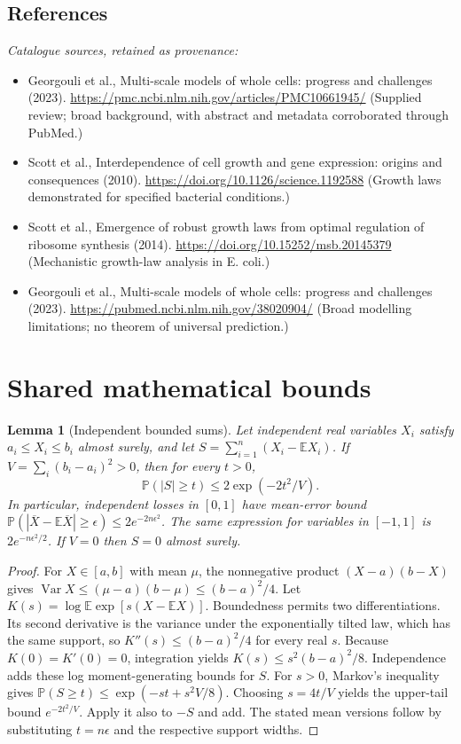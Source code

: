 \documentclass[11pt]{article}
\newcommand{\E}{\mathbb E}
\newcommand{\Prob}{\mathbb P}
\DeclareMathOperator{\Var}{Var}
\providecommand{\E}{\mathbb E}
\providecommand{\Prob}{\mathbb P}
\providecommand{\Var}{\operatorname{Var}}
\newtheorem{sharedlemma}{Lemma}[section]
\begin{document}
\subsection{References}
\noindent\emph{Catalogue sources, retained as provenance:}
\begin{itemize}
\item Georgouli et al., Multi-scale models of whole cells: progress and challenges (2023). \url{https://pmc.ncbi.nlm.nih.gov/articles/PMC10661945/} (Supplied review; broad background, with abstract and metadata corroborated through PubMed.)
\item Scott et al., Interdependence of cell growth and gene expression: origins and consequences (2010). \url{https://doi.org/10.1126/science.1192588} (Growth laws demonstrated for specified bacterial conditions.)
\item Scott et al., Emergence of robust growth laws from optimal regulation of ribosome synthesis (2014). \url{https://doi.org/10.15252/msb.20145379} (Mechanistic growth-law analysis in E. coli.)
\item Georgouli et al., Multi-scale models of whole cells: progress and challenges (2023). \url{https://pubmed.ncbi.nlm.nih.gov/38020904/} (Broad modelling limitations; no theorem of universal prediction.)
\end{itemize}
\clearpage


\appendix
\section{Shared mathematical bounds}\label{app:bounds}
\begin{sharedlemma}[Independent bounded sums]\label{lem:bounded}
Let independent real variables $X_i$ satisfy $a_i\leq X_i\leq b_i$ almost surely,
and let $S=\sum_{i=1}^n(X_i-\E X_i)$. If
$V=\sum_i(b_i-a_i)^2>0$, then for every $t>0$,
\[
 \Prob(|S|\geq t)\leq 2\exp(-2t^2/V).
\]
In particular, independent losses in $[0,1]$ have mean-error bound
$\Prob(|\overline X-\E\overline X|\geq\epsilon)
\leq2e^{-2n\epsilon^2}$. The same expression for variables in $[-1,1]$
is $2e^{-n\epsilon^2/2}$. If $V=0$ then $S=0$ almost surely.
\end{sharedlemma}
\begin{proof}
For $X\in[a,b]$ with mean $\mu$, the nonnegative product
$(X-a)(b-X)$ gives
$\Var X\leq(\mu-a)(b-\mu)\leq(b-a)^2/4$.
Let $K(s)=\log\E\exp[s(X-\E X)]$.
Boundedness permits two differentiations. Its second derivative is the variance
under the exponentially tilted law, which has the same support, so
$K''(s)\leq(b-a)^2/4$ for every real $s$.
Because $K(0)=K'(0)=0$, integration yields
$K(s)\leq s^2(b-a)^2/8$.
Independence adds these log moment-generating bounds for $S$.
For $s>0$, Markov's inequality gives
$\Prob(S\geq t)\leq\exp(-st+s^2V/8)$.
Choosing $s=4t/V$ yields the upper-tail bound $e^{-2t^2/V}$.
Apply it also to $-S$ and add. The stated mean versions follow by substituting
$t=n\epsilon$ and the respective support widths.
\end{proof}
\end{document}
